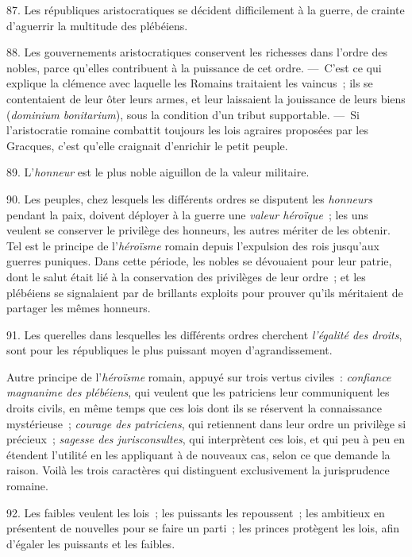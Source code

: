 \documentclass[french,twoside]{book} %
\begin{document}
87. Les républiques aristocratiques se décident difficilement à la guerre, de crainte d’aguerrir la multitude des plébéiens.\par
88. Les gouvernements aristocratiques conservent les richesses dans l’ordre des nobles, parce qu’elles contribuent à la puissance de cet ordre. — C’est ce qui explique la clémence avec laquelle les Romains traitaient les vaincus ; ils se contentaient de leur ôter  leurs armes, et leur laissaient la jouissance de leurs biens ({\itshape dominium bonitarium}), sous la condition d’un tribut supportable. — Si l’aristocratie romaine combattit toujours les lois agraires proposées par les Gracques, c’est qu’elle craignait d’enrichir le petit peuple.\par
89. L’{\itshape honneur} est le plus noble aiguillon de la valeur militaire.\par
90. Les peuples, chez lesquels les différents ordres se disputent les {\itshape honneurs} pendant la paix, doivent déployer à la guerre une {\itshape valeur héroïque} ; les uns veulent se conserver le privilège des honneurs, les autres mériter de les obtenir. Tel est le principe de l’{\itshape héroïsme} romain depuis l’expulsion des rois jusqu’aux guerres puniques. Dans cette période, les nobles se dévouaient pour leur patrie, dont le salut était lié à la conservation des privilèges de leur ordre ; et les plébéiens se signalaient par de brillants exploits pour prouver qu’ils méritaient de partager les mêmes honneurs.\par
91. Les querelles dans lesquelles les différents ordres cherchent {\itshape l’égalité des droits}, sont pour les républiques le plus puissant moyen d’agrandissement.\par
Autre principe de l’{\itshape héroïsme} romain, appuyé sur trois vertus civiles : {\itshape confiance magnanime des plébéiens}, qui veulent que les patriciens leur communiquent  les droits civils, en même temps que ces lois dont ils se réservent la connaissance mystérieuse ; {\itshape courage des patriciens}, qui retiennent dans leur ordre un privilège si précieux ; {\itshape sagesse des jurisconsultes}, qui interprètent ces lois, et qui peu à peu en étendent l’utilité en les appliquant à de nouveaux cas, selon ce que demande la raison. Voilà les trois caractères qui distinguent exclusivement la jurisprudence romaine.\par
92. Les faibles veulent les lois ; les puissants les repoussent ; les ambitieux en présentent de nouvelles pour se faire un parti ; les princes protègent les lois, afin d’égaler les puissants et les faibles.\par
\end{document}
